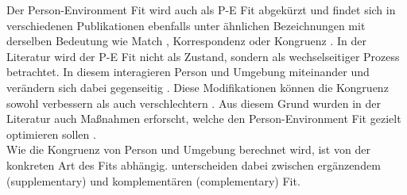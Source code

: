 Der Person-Environment Fit wird auch als P-E Fit abgekürzt \cite[S. 428]{dawis:2002} und findet sich in verschiedenen Publikationen ebenfalls unter ähnlichen Bezeichnungen mit derselben Bedeutung wie Match \cite[S. 2]{player:2017}, Korrespondenz \cite[S. 1]{eggerth:2008} oder Kongruenz \cite[S. 1]{muchinsky:1987}. In der Literatur wird der P-E Fit nicht als Zustand, sondern als wechselseitiger Prozess betrachtet. In diesem interagieren Person und Umgebung miteinander und verändern sich dabei gegenseitig \cite[S. 21f.]{roberts:2006}. Diese Modifikationen können die Kongruenz sowohl verbessern als auch verschlechtern \cite[S. 4]{caplan:1987}. Aus diesem Grund wurden in der Literatur auch Maßnahmen erforscht, welche den Person-Environment Fit gezielt optimieren sollen \cite[S. 16]{cable:2001}.\\
Wie die Kongruenz von Person und Umgebung berechnet wird, ist von der konkreten Art des Fits abhängig. \textcite[S. 1]{muchinsky:1987} unterscheiden dabei zwischen ergänzendem (supplementary) und komplementären (complementary) Fit.

